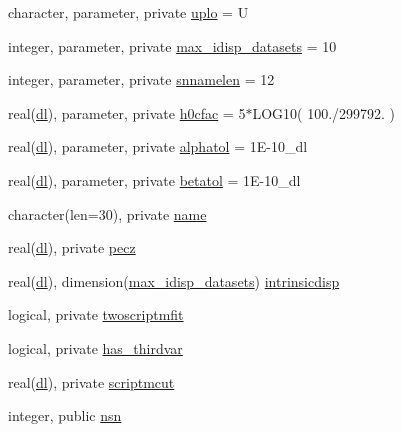 \begin{DoxyCompactItemize}
\item 
character, parameter, private \mbox{\hyperlink{namespacejla_ae9dda5d2cfb1fec80f10dea135ea407e}{uplo}} = \textquotesingle{}U\textquotesingle{}
\item 
integer, parameter, private \mbox{\hyperlink{namespacejla_a15038ba72bb06d328f2c43f0d0dd5a53}{max\+\_\+idisp\+\_\+datasets}} = 10
\item 
integer, parameter, private \mbox{\hyperlink{namespacejla_a211c3f57dbbc51d6959058d935cc0fb6}{snnamelen}} = 12
\item 
real(\mbox{\hyperlink{namespacejla_a3aa6435b4e08f1d532390186ac608741}{dl}}), parameter, private \mbox{\hyperlink{namespacejla_ac0c65fbeb2a567849038727459759c29}{h0cfac}} = 5$\ast$L\+O\+G10( 100./299792. )
\item 
real(\mbox{\hyperlink{namespacejla_a3aa6435b4e08f1d532390186ac608741}{dl}}), parameter, private \mbox{\hyperlink{namespacejla_a0298c9010520a99e272978ce5f61a83a}{alphatol}} = 1\+E-\/10\+\_\+dl
\item 
real(\mbox{\hyperlink{namespacejla_a3aa6435b4e08f1d532390186ac608741}{dl}}), parameter, private \mbox{\hyperlink{namespacejla_a5ef48a10dbf7795c2f5d30b11434bbd4}{betatol}} = 1\+E-\/10\+\_\+dl
\item 
character(len=30), private \mbox{\hyperlink{namespacejla_a344f6058fc2504417d29ec6990051554}{name}}
\item 
real(\mbox{\hyperlink{namespacejla_a3aa6435b4e08f1d532390186ac608741}{dl}}), private \mbox{\hyperlink{namespacejla_a5f4aaf92cb5a44de1cce93628083b789}{pecz}}
\item 
real(\mbox{\hyperlink{namespacejla_a3aa6435b4e08f1d532390186ac608741}{dl}}), dimension(\mbox{\hyperlink{namespacejla_a15038ba72bb06d328f2c43f0d0dd5a53}{max\+\_\+idisp\+\_\+datasets}}) \mbox{\hyperlink{namespacejla_a20678b08d3fa64ee1a64c9ff41d1cdf9}{intrinsicdisp}}
\item 
logical, private \mbox{\hyperlink{namespacejla_a6aade81a34ccb4e5795d2141aeace91d}{twoscriptmfit}}
\item 
logical, private \mbox{\hyperlink{namespacejla_a340aa04c1acf8e62ad8fe9261de0ad91}{has\+\_\+thirdvar}}
\item 
real(\mbox{\hyperlink{namespacejla_a3aa6435b4e08f1d532390186ac608741}{dl}}), private \mbox{\hyperlink{namespacejla_af11758b53916846ed4875f3664797cb4}{scriptmcut}}
\item 
integer, public \mbox{\hyperlink{namespacejla_aff413afd9288880fbc89d3a1f24f60eb}{nsn}}
\item 

\end{DoxyCompactItemize}
